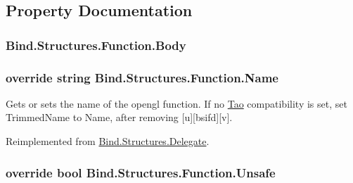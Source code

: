 \subsection{Property Documentation}
\hypertarget{class_bind_1_1_structures_1_1_function_a3f1c0b31afb0138c5dec9335875b07e3}{
\subsubsection[{Body}]{ Bind.Structures.Function.Body}}
\label{class_bind_1_1_structures_1_1_function_a3f1c0b31afb0138c5dec9335875b07e3}
\hypertarget{class_bind_1_1_structures_1_1_function_a99ff266fee9cde8a0dfe69d0e0e33bc6}{
\subsubsection[{Name}]{\setlength{\rightskip}{0pt plus 5cm}override string Bind.Structures.Function.Name}}
\label{class_bind_1_1_structures_1_1_function_a99ff266fee9cde8a0dfe69d0e0e33bc6}


Gets or sets the name of the opengl function. If no \hyperlink{namespace_tao}{Tao} compatibility is set, set TrimmedName to Name, after removing \mbox{[}u\mbox{]}\mbox{[}bsifd\mbox{]}\mbox{[}v\mbox{]}. 



Reimplemented from \hyperlink{class_bind_1_1_structures_1_1_delegate_a320cee119e89464c59f9ad8cec2fc4f7}{Bind.Structures.Delegate}.

\hypertarget{class_bind_1_1_structures_1_1_function_a2f66fa19d8fa8035272d2e9cdd4f6b15}{
\subsubsection[{Unsafe}]{\setlength{\rightskip}{0pt plus 5cm}override bool Bind.Structures.Function.Unsafe}}
\label{class_bind_1_1_structures_1_1_function_a2f66fa19d8fa8035272d2e9cdd4f6b15}


